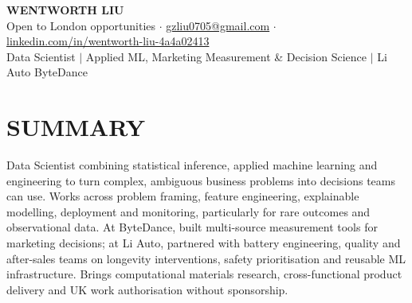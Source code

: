 \documentclass[a4paper,10pt]{article}
\begin{document}
\fontsize{10pt}{11.8pt}\selectfont

\begin{center}
{\Large\bfseries WENTWORTH LIU}\\[2pt]
{\small Open to London opportunities \;$\cdot$\; \href{mailto:gzliu0705@gmail.com}{gzliu0705@gmail.com} \;$\cdot$\; \href{https://www.linkedin.com/in/wentworth-liu-4a4a02413}{linkedin.com/in/wentworth-liu-4a4a02413}}\\[2pt]
{\small Data Scientist \;$\vert$\; Applied ML, Marketing Measurement \& Decision Science \;$\vert$\; Li Auto \textperiodcentered{} ByteDance}
\end{center}
\vspace{-4pt}

\section{SUMMARY}
Data Scientist combining statistical inference, applied machine learning and engineering to turn complex, ambiguous business problems into decisions teams can use. Works across problem framing, feature engineering, explainable modelling, deployment and monitoring, particularly for rare outcomes and observational data. At ByteDance, built multi-source measurement tools for marketing decisions; at Li Auto, partnered with battery engineering, quality and after-sales teams on longevity interventions, safety prioritisation and reusable ML infrastructure. Brings computational materials research, cross-functional product delivery and UK work authorisation without sponsorship.
\end{document}
